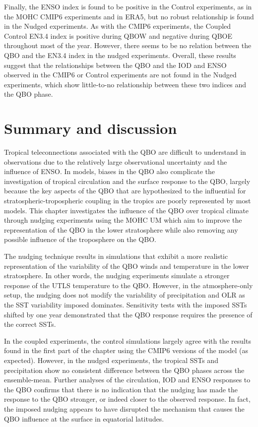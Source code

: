 Finally, the ENSO index is found to be positive in the Control experiments, as in the MOHC CMIP6 experiments and in ERA5, but no robust relationship is found in the Nudged experiments. As with the CMIP6 experiments, the Coupled Control EN3.4 index is positive during QBOW and negative during QBOE throughout most of the year. However, there seems to be no relation between the QBO and the EN3.4 index in the nudged experiments. 
Overall, these results suggest that the relationships between the QBO and the IOD and ENSO observed in the CMIP6 or Control experiments are not found in the Nudged experiments, which show little-to-no relationship between these two indices and the QBO phase.

\section{Summary and discussion}

Tropical teleconnections associated with the QBO are difficult to understand in observations due to the relatively large observational uncertainty and the influence of ENSO. 
In models, biases in the QBO also complicate the investigation of tropical circulation and the surface response to the QBO, largely because the key aspects of the QBO that are hypothesized to the influential for stratospheric-tropospheric coupling in the tropics are poorly represented by most models. 
This chapter investigates the influence of the QBO over tropical climate through nudging experiments using the MOHC UM which aim to improve the representation of the QBO in the lower stratosphere while also removing any possible influence of the troposphere on the QBO.  

The nudging technique results in simulations that exhibit a more realistic representation of the variability of the QBO winds and temperature in the lower stratosphere. In other words, the nudging experiments simulate a stronger response of the UTLS temperature to the QBO. 
However, in the atmosphere-only setup, the nudging does not modify the variability of precipitation and OLR as the SST variability imposed dominates. 
Sensitivity tests with the imposed SSTs shifted by one year demonstrated that the QBO response requires the presence of the correct SSTs.

In the coupled experiments, the control simulations largely agree with the results found in the first part of the chapter using the CMIP6 versions of the model (as expected). However, in the nudged experiments, the tropical SSTs and precipitation show no consistent difference between the QBO phases across the ensemble-mean.  Further analyses of the circulation, IOD and ENSO responses to the QBO confirms that there is no indication that the nudging has made the response to the QBO stronger, or indeed closer to the observed response. In fact, the imposed nudging appears to have disrupted the mechanism that causes the QBO influence at the surface in equatorial latitudes. 

